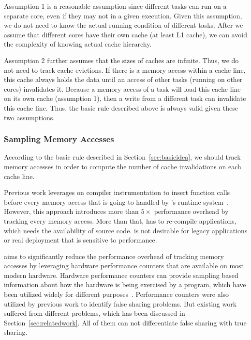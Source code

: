 Assumption 1 is a reasonable assumption since different tasks can run on a separate core, even if they may not in a given execution. Given this assumption, we do not need to know the actual running condition of different tasks. After we assume that different cores have their own cache (at least L1 cache), we can avoid the complexity of knowing actual cache hierarchy. 

Assumption 2 further assumes that the sizes of caches are infinite. Thus, we do not need to track cache evictions. If there is a memory access within a cache line, this cache always holds the data until an access of other tasks (running on other cores) invalidates it. Because a memory access of a task will load this cache line on its own cache (assumption 1), then a write from a different task can invalidate this cache line. Thus, the basic rule described above is always valid given these two assumptions.  

 


\subsubsection{Sampling Memory Accesses}
\label{sec:perfcounter}

According to the basic rule described in Section~\ref{sec:basicidea}, we should track memory accesses in order to compute the number of cache invalidations on each cache line. 


Previous work \Predator{} leverages on compiler instrumentation to insert function calls before every memory access that is going to handled by \Predator{}'s runtime system~\cite{Predator}. However, this approach introduces more than $5\times$ performance overhead by tracking every memory access. More than that, \Predator{} has to re-compile applications, which needs the availability of source code. \Predator{} is not desirable for legacy applications or real deployment that is sensitive to performance. 

\cheetah{} aims to significantly reduce the performance overhead of tracking memory accesses by leveraging hardware performance counters that are available on most modern hardware. Hardware performance counters can provide sampling based information about how the hardware is being exercised by a program, which have been utilized widely for different purposes~\cite{Mucci99papi}. Performance counters were also utilized by previous work to identify false sharing problems. But existing work suffered from different problems, which has been discussed in Section~\ref{sec:relatedwork}. All of them can not differentiate false sharing with true sharing. 
 
